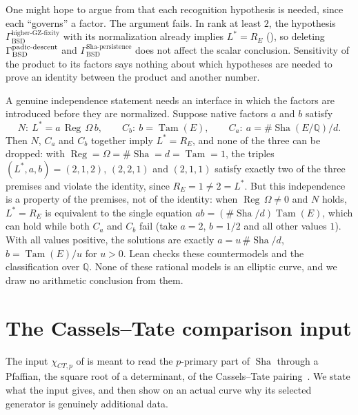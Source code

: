 \documentclass[11pt]{article}
\theoremstyle{definition}
\newcommand{\Q}{\mathbb{Q}}
\newcommand{\Sha}{\operatorname{Sha}}
\newcommand{\Reg}{\operatorname{Reg}}
\newcommand{\Tam}{\operatorname{Tam}}
\newcommand{\GammaSP}{\Gamma_{\mathrm{BSD}}^{\mathrm{Sha\text{-}persistence}}}
\newcommand{\GammaGZ}{\Gamma_{\mathrm{BSD}}^{\mathrm{higher\text{-}GZ\text{-}fixity}}}
\newcommand{\chiCTp}{\chi_{CT,p}}                       \newcommand{\AofE}{\mathcal{A}_E}                        \newcommand{\etap}{\eta_p}                              \newcommand{\RefStable}{\mathbf{RefStable\,AOR}}
\begin{document}
\begin{remark}\label{rmk:closure:sensitivity-not-necessity}
One might hope to argue from  that
each recognition hypothesis is needed, since each ``governs'' a factor.
The argument fails.  In rank at least $2$, the hypothesis $\GammaGZ$ with
its normalization already implies $L^*=R_E$
(), so deleting $\Gamma_{\mathrm{BSD}}^{\mathrm{padic\text{-}descent}}$ and $\GammaSP$
does not affect the scalar conclusion.  Sensitivity of the product to its
factors says nothing about which hypotheses are needed to prove an
identity between the product and another number.

A genuine independence statement needs an interface in which the factors
are introduced before they are normalized.  Suppose native factors $a$ and
$b$ satisfy
\[
  N:\ L^*=a\,\Reg\,\Omega\,b,\qquad
  C_b:\ b=\Tam(E),\qquad
  C_a:\ a=\#\Sha(E/\Q)/d .
\]
Then $N$, $C_a$ and $C_b$ together imply $L^*=R_E$, and none of the three
can be dropped: with $\Reg=\Omega=\#\Sha=d=\Tam=1$, the triples
$(L^*,a,b)=(2,1,2)$, $(2,2,1)$ and $(2,1,1)$ satisfy exactly two of the
three premises and violate the identity, since $R_E=1\neq2=L^*$.  But
this independence is a property of the premises, not of the identity:
when $\Reg\,\Omega\neq0$ and $N$ holds, $L^*=R_E$ is equivalent to the
single equation $ab=(\#\Sha/d)\Tam(E)$, which can hold while both $C_a$
and $C_b$ fail (take $a=2$, $b=1/2$ and all other values $1$).  With
all values positive, the solutions are exactly $a=u\,\#\Sha/d$,
$b=\Tam(E)/u$ for $u>0$.  Lean checks these countermodels and the
classification over $\Q$.  None of these rational models is an elliptic
curve, and we draw no arithmetic conclusion from them.
\end{remark}
 \section{The Cassels--Tate comparison input}
\label{sec:chi-ct-p}

The input $\chiCTp$ of  is meant to
read the $p$-primary part of $\Sha$ through a Pfaffian, the square root of
a determinant, of the Cassels--Tate
pairing~\citep{Cassels1962,PoonenStoll1999}.  We state what the input
gives, and then show on an actual curve why its selected generator is
genuinely additional data.
\end{document}
